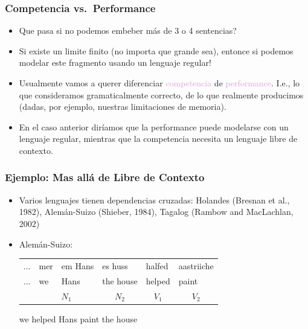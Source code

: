 \documentclass[compress,color=usenames]{beamer}
\newcommand{\mH}[1]{\textcolor{Plum}{#1}}
\begin{document}
\begin{frame}
\frametitle{Competencia vs.\ Performance}

\begin{itemize}
\item Que pasa si no podemos embeber m\'as de 3 o 4 sentencias? 

\item Si existe 
un limite finito (no importa que grande sea), entonce si podemos modelar 
este fragmento usando un lenguaje regular!

\item Usualmente vamos a querer diferenciar \mH{competencia} 
de \mH{performance}. I.e., lo que consideramos gramaticalmente correcto, de lo 
que realmente producimos (dadas, por ejemplo, nuestras limitaciones de memoria).

\item En el caso anterior dir\'iamos que la performance puede modelarse con 
un lenguaje regular, mientras que la competencia necesita un lenguaje libre de 
contexto.
\end{itemize}

\end{frame}

\begin{frame}
\frametitle{Ejemplo: Mas all\'a de Libre de Contexto}

\begin{itemize}
\item Varios lenguajes tienen dependencias cruzadas:
Holandes (Bresnan et al., 1982), Alem\'an-Suizo (Shieber, 1984), Tagalog
(Rambow and MacLachlan, 2002)\pause

\item Alem\'an-Suizo:
\begin{center}
\begin{tabular}{llllll}
... & mer & em Hans & es huss   & halfed & aastriiche \\
... & we  & Hans    & the house & helped & paint\\
    & \multicolumn{2}{c}{$N_1$} & 
      \multicolumn{1}{c}{$N_2$} &
      \multicolumn{1}{c}{$V_1$} & 
      \multicolumn{1}{c}{$V_2$}
\end{tabular}

we helped Hans paint the house
\end{center}

\end{itemize}

\end{frame}
\end{document}
